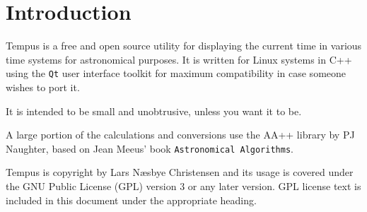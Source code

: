 \section{Introduction}
Tempus is a free and open source utility for displaying the current time in various time systems for astronomical purposes. It is written for Linux systems in C++ using the \texttt{Qt} user interface toolkit for maximum compatibility in case someone wishes to port it.

It is intended to be small and unobtrusive, unless you want it to be.

A large portion of the calculations and conversions use the AA++ library by PJ Naughter, based on Jean Meeus' book \texttt{Astronomical Algorithms}.

Tempus is copyright by Lars N{\ae}sbye Christensen and its usage is covered under the GNU Public License (GPL) version 3 or any later version. GPL license text is included in this document under the appropriate heading.

